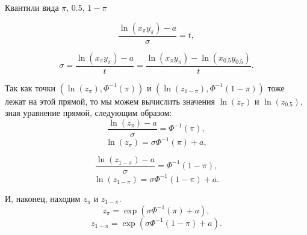 \documentclass[ucs, notheorems, handout]{beamer}
\begin{document}
\begin{frame}{Квантили вида $\pi$, 0.5, $1-\pi$}
	
	\begin{equation*}
		\dfrac{\ln(x_{\pi}y_{\pi})-a}{\sigma}=t,
	\end{equation*}
	
	\begin{equation*}
		\sigma=\dfrac{\ln(x_{\pi}y_{\pi})-a}{t}=\dfrac{\ln(x_{\pi}y_{\pi})-\ln(x_{0.5}y_{0.5})}{t}.
	\end{equation*}

Так как точки $(\ln(z_{\pi}), \Phi^{-1}(\pi))$ и $(\ln(z_{1-\pi}), \Phi^{-1}(1-\pi))$ тоже лежат на этой прямой, то мы можем вычислить значения $\ln(z_{\pi})$ и $\ln(z_{0.5})$, зная уравнение прямой, следующим образом:
\begin{equation*}
	\dfrac{\ln(z_{\pi})-a}{\sigma}=\Phi^{-1}(\pi),
\end{equation*}
\begin{equation*}
	\ln(z_{\pi})=\sigma\Phi^{-1}(\pi)+a,
\end{equation*}

\begin{equation*}
	\dfrac{\ln(z_{1-\pi})-a}{\sigma}=\Phi^{-1}(1-\pi),
\end{equation*}
\begin{equation*}
	\ln(z_{1-\pi})=\sigma\Phi^{-1}(1-\pi)+a.
\end{equation*}

И, наконец, находим $z_{\pi}$ и $z_{1-\pi}$.
\begin{equation*}
	z_{\pi}=\exp(\sigma\Phi^{-1}(\pi)+a),
\end{equation*}
\begin{equation*}
	z_{1-\pi}=\exp(\sigma\Phi^{-1}(1-\pi)+a).
\end{equation*}
	
\end{frame}
\end{document}
